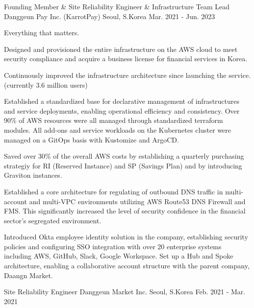 \begin{cventries}
    \cventry
    {Founding Member \& Site Reliability Engineer \& Infrastructure Team Lead} %
    {Danggeun Pay Inc. (KarrotPay)} %
    {Seoul, S.Korea} %
    {Mar. 2021 - Jun. 2023} %
    {
        \begin{cvitems} %
            \item {Everything that matters.}
            \item {Designed and provisioned the entire infrastructure on the AWS cloud to meet security compliance and acquire a business license for financial services in Korea.}
            \item {Continuously improved the infrastructure architecture since launching the service. (currently 3.6 million users)}
            \item {Established a standardized base for declarative management of infrastructures and service deployments, enabling operational efficiency and consistency. Over 90\% of AWS resources were all managed through standardized terraform modules. All add-ons and service workloads on the Kubernetes cluster were managed on a GitOps basis with Kustomize and ArgoCD.}
            \item {Saved over 30\% of the overall AWS costs by establishing a quarterly purchasing strategiy for RI (Reserved Instance) and SP (Savings Plan) and by introducing Graviton instances.}
            \item {Established a core architecture for regulating of outbound DNS traffic in multi-account and multi-VPC environments utilizing AWS Route53 DNS Firewall and FMS. This significantly increased the level of security confidence in the financial sector's segregated environment.}
            \item {Introduced Okta employee identity solution in the company, establishing security policies and configuring SSO integration with over 20 enterprise systems including AWS, GitHub, Slack, Google Workspace. Set up a Hub and Spoke architecture, enabling a collaborative account structure with the parent company, Daangn Market.}
        \end{cvitems}
    }

    \cventry
    {Site Reliability Engineer} %
    {Danggeun Market Inc.} %
    {Seoul, S.Korea} %
    {Feb. 2021 - Mar. 2021} %
    {
    }


\end{cventries}
